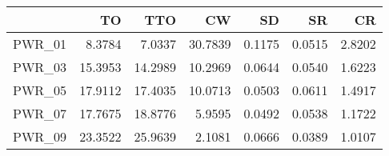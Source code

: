 \begin{tabular}{rrrrrrr}
  \toprule
 & TO & TTO & CW & SD & SR & CR \\ 
  \midrule
PWR\_01 & 8.3784 & 7.0337 & 30.7839 & 0.1175 & 0.0515 & 2.8202 \\ 
  PWR\_03 & 15.3953 & 14.2989 & 10.2969 & 0.0644 & 0.0540 & 1.6223 \\ 
  PWR\_05 & 17.9112 & 17.4035 & 10.0713 & 0.0503 & 0.0611 & 1.4917 \\ 
  PWR\_07 & 17.7675 & 18.8776 & 5.9595 & 0.0492 & 0.0538 & 1.1722 \\ 
  PWR\_09 & 23.3522 & 25.9639 & 2.1081 & 0.0666 & 0.0389 & 1.0107 \\ 
   \bottomrule
\end{tabular}
